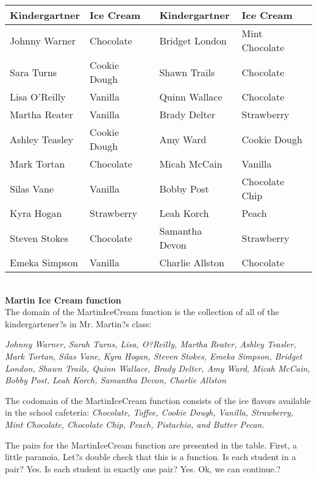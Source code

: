 \documentclass{ximera}
\begin{document}
\begin{center}

\begin{tabular}{|l|l|l|l|}
\hline
Kindergartner & Ice Cream & Kindergartner & Ice Cream \\\hline 
Johnny Warner & Chocolate & Bridget London & Mint Chocolate \\\hline 
Sara Turns & Cookie Dough & Shawn Trails & Chocolate \\\hline 
Lisa O'Reilly & Vanilla & Quinn Wallace & Chocolate \\\hline 
Martha Reater & Vanilla & Brady Delter & Strawberry \\\hline 
Ashley Teasley & Cookie Dough & Amy Ward & Cookie Dough \\\hline 
Mark Tortan & Chocolate & Micah McCain & Vanilla \\\hline 
Silas Vane & Vanilla & Bobby Post & Chocolate Chip \\\hline 
Kyra Hogan & Strawberry & Leah Korch & Peach \\\hline 
Steven Stokes & Chocolate & Samantha Devon & Strawberry \\\hline 
Emeka Simpson & Vanilla & Charlie Allston & Chocolate \\\hline 
\end{tabular}

\end{center}

\quad \\
\textbf{Martin Ice Cream function} \\

The domain of the MartinIceCream function is the collection of all of the kindergartener?s in Mr. Martin?s class: 

\textit{Johnny Warner, Sarah Turns, Lisa, O?Reilly, Martha Reater, Ashley Teasler, Mark Tortan, Silas Vane, Kyra Hogan, Steven Stokes, Emeka Simpson, Bridget London, Shawn Trails, Quinn Wallace, Brady Delter, Amy Ward, Micah McCain, Bobby Post, Leah Korch, Samantha Devon, Charlie Allston}


The codomain of the MartinIceCream function consists of the ice flavors available in the school cafeteria:
\textit{Chocolate, Toffee, Cookie Dough, Vanilla, Strawberry, Mint Chocolate, Chocolate Chip, Peach, Pistachio, and Butter Pecan.}

The pairs for the MartinIceCream function are presented in the table. First, a little paranoia. Let?s double check that this is a function.
Is each student in a pair? Yes. Is each student in exactly one pair? Yes. Ok, we can continue.?
\end{document}
